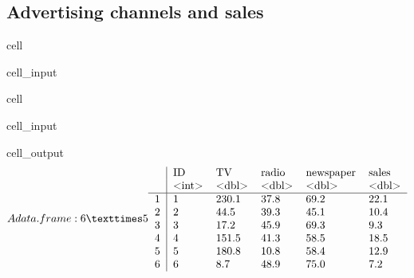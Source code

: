 \documentclass[letterpaper,10pt,english]{jupyterBook}
\begin{document}
\subsection{Advertising channels and sales}
\label{\detokenize{exercises_unit_4:advertising-channels-and-sales}}
\begin{sphinxuseclass}{cell}\begin{sphinxVerbatimInput}

\begin{sphinxuseclass}{cell_input}
\begin{sphinxVerbatim}[commandchars=\\\{\}]

\end{sphinxVerbatim}

\end{sphinxuseclass}\end{sphinxVerbatimInput}

\end{sphinxuseclass}
\begin{sphinxuseclass}{cell}\begin{sphinxVerbatimInput}

\begin{sphinxuseclass}{cell_input}
\begin{sphinxVerbatim}[commandchars=\\\{\}]
\end{sphinxVerbatim}

\end{sphinxuseclass}\end{sphinxVerbatimInput}
\begin{sphinxVerbatimOutput}

\begin{sphinxuseclass}{cell_output}\begin{equation*}
\begin{split}A data.frame: 6 × 5
\begin{tabular}{r|lllll}
  & ID & TV & radio & newspaper & sales\\
  & <int> & <dbl> & <dbl> & <dbl> & <dbl>\\
\hline
	1 & 1 & 230.1 & 37.8 & 69.2 & 22.1\\
	2 & 2 &  44.5 & 39.3 & 45.1 & 10.4\\
	3 & 3 &  17.2 & 45.9 & 69.3 &  9.3\\
	4 & 4 & 151.5 & 41.3 & 58.5 & 18.5\\
	5 & 5 & 180.8 & 10.8 & 58.4 & 12.9\\
	6 & 6 &   8.7 & 48.9 & 75.0 &  7.2\\
\end{tabular}\end{split}
\end{equation*}
\end{sphinxuseclass}\end{sphinxVerbatimOutput}

\end{sphinxuseclass}
\end{document}
